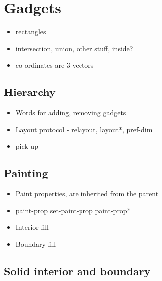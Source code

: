 \documentclass{book}
\begin{document}
\section{Gadgets}

\begin{itemize}

\item rectangles

\item intersection, union, other stuff, inside?

\item co-ordinates are 3-vectors

\end{itemize}

\subsection{Hierarchy}

\begin{itemize}

\item Words for adding, removing gadgets

\item Layout protocol - relayout, layout*, pref-dim

\item pick-up

\end{itemize}

\subsection{Painting}

\begin{itemize}

\item Paint properties, are inherited from the parent

\item paint-prop set-paint-prop paint-prop*

\item Interior fill

\item Boundary fill

\end{itemize}

\subsection{Solid interior and boundary}
\end{document}
